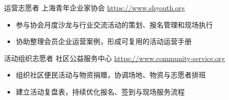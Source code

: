 \documentclass[a4paper, serif, 10pt]{moderncv}
\begin{document}
        {运营志愿者}
        {上海青年企业家协会}
        {\url{https://www.shyouth.org}}
        {}
        {\begin{itemize}
\item 参与协会月度沙龙与行业交流活动的策划、报名管理和现场执行
\item 协助整理会员企业运营案例，形成可复用的活动运营手册
\end{itemize}}
    

        {活动组织志愿者}
        {社区公益服务中心}
        {\url{https://www.community-service.org}}
        {}
        {\begin{itemize}
\item 组织社区便民活动与物资捐赠，协调场地、物资与志愿者排班
\item 建立活动复盘表，持续优化报名、签到与现场服务流程
\end{itemize}}
    
\end{document}
